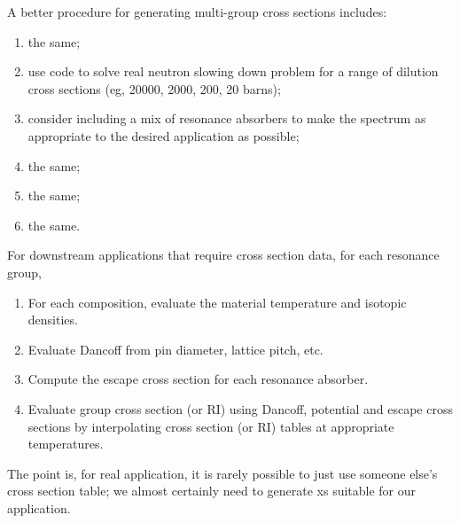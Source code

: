 \documentclass{school-22.211-notes}
\begin{document}
A better procedure for generating multi-group cross sections includes:
\begin{enumerate}
\item the same;
\item use code to solve real neutron slowing down problem for a range of dilution cross sections (eg, 20000, 2000, 200, 20 barns);
\item consider including a mix of resonance absorbers to make the spectrum as appropriate to the desired application as possible;
\item the same;
\item the same;
\item the same.
\end{enumerate}

For downstream applications that require cross section data, for each resonance group,
\begin{enumerate}
\item For each composition, evaluate the material temperature and isotopic densities. 
\item Evaluate Dancoff from pin diameter, lattice pitch, etc. 
\item Compute the escape cross section for each resonance absorber.
\item Evaluate group cross section (or RI) using Dancoff, potential and escape cross sections by interpolating cross section (or RI) tables at appropriate temperatures. 
\end{enumerate}
The point is, for real application, it is rarely possible to just use someone else's cross section table; we almost certainly need to generate xs suitable for our application. 
\end{document}
